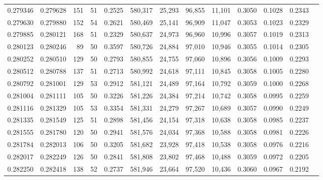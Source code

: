 \begin{tabular}{rrrrrrrrrrrrr}
0.279346 & 0.279628 &   151 &  51 &                                     0.2525 & 580,317 &  25,293 &  96,855 &  11,101 & 0.3050 & 0.1028 & 0.2343 \\
0.279630 & 0.279880 &   152 &  54 &                                     0.2621 & 580,469 &  25,141 &  96,909 &  11,047 & 0.3053 & 0.1023 & 0.2329 \\
0.279885 & 0.280121 &   168 &  51 &                                     0.2329 & 580,637 &  24,973 &  96,960 &  10,996 & 0.3057 & 0.1019 & 0.2313 \\
0.280123 & 0.280246 &    89 &  50 &                                     0.3597 & 580,726 &  24,884 &  97,010 &  10,946 & 0.3055 & 0.1014 & 0.2305 \\
0.280252 & 0.280510 &   129 &  50 &                                     0.2793 & 580,855 &  24,755 &  97,060 &  10,896 & 0.3056 & 0.1009 & 0.2293 \\
0.280512 & 0.280788 &   137 &  51 &                                     0.2713 & 580,992 &  24,618 &  97,111 &  10,845 & 0.3058 & 0.1005 & 0.2280 \\
0.280792 & 0.281001 &   129 &  53 &                                     0.2912 & 581,121 &  24,489 &  97,164 &  10,792 & 0.3059 & 0.1000 & 0.2268 \\
0.281004 & 0.281111 &   105 &  50 &                                     0.3226 & 581,226 &  24,384 &  97,214 &  10,742 & 0.3058 & 0.0995 & 0.2259 \\
0.281116 & 0.281329 &   105 &  53 &                                     0.3354 & 581,331 &  24,279 &  97,267 &  10,689 & 0.3057 & 0.0990 & 0.2249 \\
0.281335 & 0.281549 &   125 &  51 &                                     0.2898 & 581,456 &  24,154 &  97,318 &  10,638 & 0.3058 & 0.0985 & 0.2237 \\
0.281555 & 0.281780 &   120 &  50 &                                     0.2941 & 581,576 &  24,034 &  97,368 &  10,588 & 0.3058 & 0.0981 & 0.2226 \\
0.281784 & 0.282013 &   106 &  50 &                                     0.3205 & 581,682 &  23,928 &  97,418 &  10,538 & 0.3058 & 0.0976 & 0.2216 \\
0.282017 & 0.282249 &   126 &  50 &                                     0.2841 & 581,808 &  23,802 &  97,468 &  10,488 & 0.3059 & 0.0972 & 0.2205 \\
0.282250 & 0.282418 &   138 &  52 &                                     0.2737 & 581,946 &  23,664 &  97,520 &  10,436 & 0.3060 & 0.0967 & 0.2192 \\

\end{tabular}

